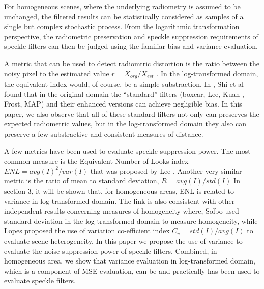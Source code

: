 \documentclass[journal]{IEEEtran}
\begin{document}
For homogeneous scenes, 
	where the underlying radiometry is assumed to be unchanged, 
	the filtered results can be statistically considered as samples of 
		a single but complex stochastic process.
From the logarithmic transformation perspective, the radiometric preservation and speckle suppression requirements of speckle filters can then be judged using the familiar bias and variance evaluation.

A metric that can be used to detect radiomtric distortion is the ratio between the noisy pixel to the estimated value $r = X_{org}/X_{est}$ \cite{Oliver_2004_SciTech} \cite{Medeiros_2003_IJRS}.
In the log-transformed domain, the equivalent index would, of course, be a simple substraction.
In \cite{Shi_IGARSS_1994}, Shi et al found that 
	in the original domain the ``standard'' filters (boxcar, Lee\cite{Lee_PAMI_1980}, Kuan \cite{Kuan_1985_PAMI}, Frost\cite{Frost_PAMI_1982}, MAP\cite{Lopes_IGARSS_1990}) and their enhanced versions \cite{Lopes_TGRS_1990} can achieve negligible bias. 
In this paper, we also observe that all of these standard filters not only can preserves the expected radiometric values, but in the log-transformed domain they also can preserve a few substractive and consistent measures of distance.

A few metrics have been used to evaluate speckle suppression power.
The most common measure is the Equivalent Number of Looks index 
$ENL=avg(I)^2/var(I)$
that was proposed by Lee \cite{Lee_1981_CGIP}.
Another very similar metric is the ratio of mean to standard deviation, $R=avg(I)/std(I)$ \cite{Gagnon_SPIEProc_1997} 
In section 3, it will be shown that, for homogeneous areas, ENL is related to variance in log-transformed domain.
The link is also consistent with other independent results concerning measures of homogeneity where, Solbo \cite{Solbo_2006_TGRS} used standard deviation in the log-transformed domain to measure homogeneity, 
	while Lopes \cite{Lopes_TGRS_1990} proposed the use of variation co-efficient index $C_v = std(I)/avg(I)$ to evaluate scene heterogeneity.
In this paper we propose the use of variance to evaluate the noise suppression power of speckle filters.
Combined, in homogeneous area, we show that variance evaluation in log-transformed domain, 
	which is a component of MSE evaluation, 
	can be and practically has been used to evaluate speckle filters.
\end{document}
